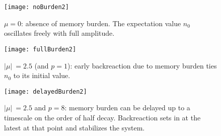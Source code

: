\documentclass[aps,prd,reprint,superscriptaddress,nofootinbib]{revtex4-2}
\makeatletter
\newcommand*{\fig}{Fig.\@\xspace}
\newcommand*{\figs}{Figs.\@\xspace}
\makeatother
\begin{document}
\begin{figure*}
	\begin{subfigure}{0.3\textwidth}
		\texttt{[image: noBurden2]}
		\caption{$\mu=0$: absence of memory burden. The expectation value $n_0$ oscillates freely with full amplitude.} 
		\label{sfig:noBurden}
	\end{subfigure}
	\begin{subfigure}{0.3\textwidth}
		\texttt{[image: fullBurden2]}
		\caption{$|\mu|\ =2.5$ (and $p=1$): early backreaction due to memory burden ties $n_0$ to its initial value.}
		\label{sfig:fullBurden}
	\end{subfigure}
	\begin{subfigure}{0.3\textwidth}
		\texttt{[image: delayedBurden2]}
		\caption{$|\mu|\ =2.5$ and $p=8$: memory burden can be delayed up to a timescale on the order of half decay. Backreaction sets in at the latest at that point and stabilizes the system.}
		\label{sfig:delayedBurden}
	\end{subfigure}
	\caption{Plots of the time evolution of $n_0$ for $N_c=25$ and $C_0 = 
\epsilon_0/\sqrt{N_c} = 1/5$. \figs \ref{sfig:noBurden} and \ref{sfig:fullBurden} follow from \eqref{expectationValueAnalytic}. \fig \ref{sfig:delayedBurden} is an approximate solution of the system \eqref{HamiltonianHigherOrder}.}
	\label{fig:burden}
\end{figure*}
\end{document}
